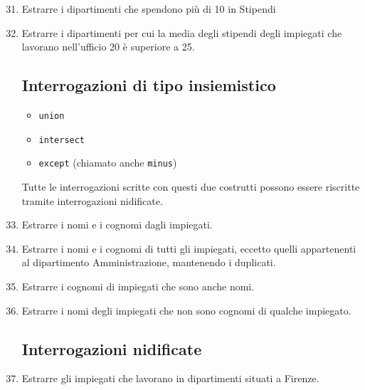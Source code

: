 \begin{enumerate}
\setcounter{enumi}{30}
	\item Estrarre i dipartimenti che spendono più di 10 in Stipendi
	


	\item Estrarre i dipartimenti per cui la media degli stipendi degli impiegati che lavorano nell'ufficio 20 è superiore a 25.
	


\subsection*{Interrogazioni di tipo insiemistico}

\begin{itemize}
	\item \texttt{union}
	\item \texttt{intersect}
	\item \texttt{except} (chiamato anche \texttt{minus})
\end{itemize}

Tutte le interrogazioni scritte con questi due costrutti possono essere riscritte tramite interrogazioni nidificate.

	\item Estrarre i nomi e i cognomi dagli impiegati.
	

	\item Estrarre i nomi e i cognomi di tutti gli impiegati, eccetto quelli appartenenti al dipartimento Amministrazione, {\btHL mantenendo i duplicati}.
	

	\item Estrarre i cognomi di impiegati che sono anche nomi.
	

	\item Estrarre i nomi degli impiegati che non sono cognomi di qualche impiegato.
	


\subsection*{Interrogazioni nidificate}

	\item Estrarre gli impiegati che lavorano in dipartimenti situati a Firenze.
	


\end{enumerate}
